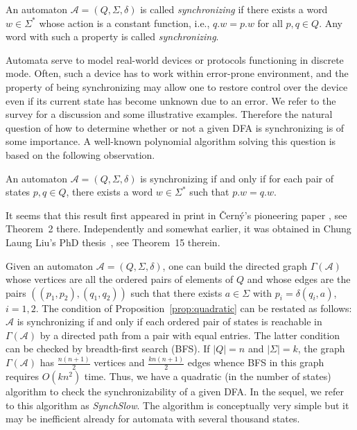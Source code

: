 \documentclass{llncs}
\begin{document}
An automaton $\mathcal{A}=(Q, \Sigma, \delta)$ is called \emph{synchronizing} if there exists a word $w \in \Sigma^*$ whose action is a constant function, i.e., $q.w = p.w$ for all $p,q \in Q$. Any word with such a property is called \emph{synchronizing}.

Automata serve to model real-world devices or protocols functioning in discrete mode. Often, such a device has to work within error-prone environment, and the property of being synchronizing may allow one to restore control over the device even if its current state has become unknown due to an error. We refer to the survey \cite{Volkov:2008} for a discussion and some illustrative examples. Therefore the natural question of how to determine whether or not a given DFA is synchronizing is of some importance. A well-known polynomial algorithm solving this question is based on the following observation.
\begin{proposition}
\label{prop:quadratic}
An automaton $\mathcal{A}=(Q, \Sigma, \delta)$ is synchronizing if and only if for each pair of states $p,q \in Q$, there exists a word $w\in\Sigma^*$ such that $p.w = q.w$.
\end{proposition}

It seems that this result first appeared in print in \v{C}ern\'y's pioneering paper \cite{Cerny:1964}, see Theorem~2 there. Independently
and somewhat earlier, it was obtained in Chung Laung Liu's PhD thesis~\cite{Liu:1963}, see Theorem~15 therein.

Given an automaton $\mathcal{A}=(Q, \Sigma, \delta)$, one can build the directed graph $\Gamma(\mathcal{A})$ whose vertices are all the ordered pairs of elements of $Q$ and whose edges are the pairs $((p_1,p_2),(q_1,q_2))$ such that there exists $a\in\Sigma$ with $p_i=\delta(q_i,a)$, $i=1,2$. The condition of Proposition~\ref{prop:quadratic} can be restated as follows: $\mathcal{A}$ is synchronizing if and only if each ordered pair of states is reachable in $\Gamma(\mathcal{A})$ by a directed path from a pair with equal entries. The latter condition can be checked by breadth-first search (BFS). If $|Q|=n$ and $|\Sigma|=k$, the graph $\Gamma(\mathcal{A})$ has $\tfrac{n(n+1)}2$ vertices and $\tfrac{kn(n+1)}2$ edges whence BFS in this graph requires $O(kn^2)$ time. Thus, we have a quadratic (in the number of states) algorithm to check the synchronizability of a given DFA. In the sequel, we refer to this algorithm as \emph{SynchSlow}. The algorithm is conceptually very simple but it may be inefficient already for automata with several thousand states.
\end{document}
